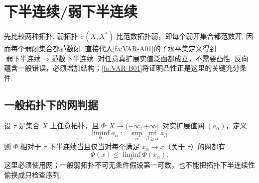 \section{下半连续/弱下半连续}\label{sec:iii06-lsc}

先比较两种拓扑. 弱拓扑 \(\displaystyle\sigma(X,X^*)\) 比范数拓扑弱，即每个弱开集合都范数开. 因而每个弱闭集合都范数闭. 直接代入\autoref{fa:VAR-A01}的子水平集定义得到
\(\displaystyle \text{弱下半连续} \;\Longrightarrow\; \text{范数下半连续}\)
对任意真扩展实值泛函都成立，不需要凸性. 反向蕴含一般错误，必须增加结构；\autoref{fa:VAR-B01}将证明凸性正是这里的关键充分条件.

\subsection{一般拓扑下的网判据}

设 \(\displaystyle\tau\) 是集合 \(\displaystyle X\) 上任意拓扑，且 \(\displaystyle\Phi:X\to(-\infty,+\infty]\). 对实扩展值网 \(\displaystyle(a_\alpha)\)，定义
\[
\liminf_\alpha a_\alpha
:=
\sup_\alpha\inf_{\beta\geqslant\alpha}a_\beta.
\]
则 \(\displaystyle\Phi\) 相对于 \(\displaystyle\tau\) 下半连续当且仅当对每个满足 \(\displaystyle x_\alpha\to x\)（关于 \(\displaystyle\tau\)）的网都有
\[
\Phi(x)
\leqslant
\liminf_\alpha\Phi(x_\alpha).
\]
这里必须使用网；一般弱拓扑不可无条件假设第一可数，也不能把拓扑下半连续性偷换成只检查序列.

